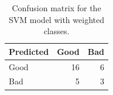\begin{table}[ht]
\centering
\begin{tabular}{lrr}
  \hline
Predicted & Good & Bad \\ 
  \hline
Good &  16 &   6 \\ 
  Bad &   5 &   3 \\ 
   \hline
\end{tabular}
\caption{Confusion matrix for the SVM model with weighted classes.} 
\label{tab:svm_confusion_matrix_weighted}
\end{table}

